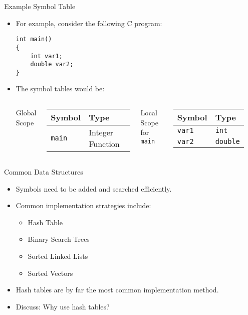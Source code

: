 \documentclass[]{beamer}
\begin{document}
\begin{frame}[fragile]{Example Symbol Table}
    \begin{itemize}[<+->]
        \item For example, consider the following C program:
        \begin{verbatim}
int main() 
{
    int var1;
    double var2;
}
        \end{verbatim}
        \item The symbol tables would be:
        \begin{columns}
                Global Scope
                \newline\begin{tabular}{|l|l|}
                    \hline
                    \textbf{Symbol} & \textbf{Type} \\
                    \hline
                    \texttt{main} & Integer Function \\
                    \hline
                \end{tabular}
                Local Scope for \texttt{main}
                \newline\begin{tabular}{|l|l|}
                    \hline
                    \textbf{Symbol} & \textbf{Type} \\
                    \hline
                    \texttt{var1} & \texttt{int}\\
                    \hline
                    \texttt{var2} & \texttt{double}\\
                    \hline
                \end{tabular}
        \end{columns}
    \end{itemize}
\end{frame}

\begin{frame}{Common Data Structures}
    \begin{itemize}[<+->]
        \item Symbols need to be added and searched efficiently.
        \item Common implementation strategies include:
        \begin{itemize}
            \item Hash Table
            \item Binary Search Trees
            \item Sorted Linked Lists
            \item Sorted Vectors
        \end{itemize}
        \item Hash tables are by far the most common implementation
            method. 
        \item Discuss: Why use hash tables?
    \end{itemize}
\end{frame}
\end{document}
